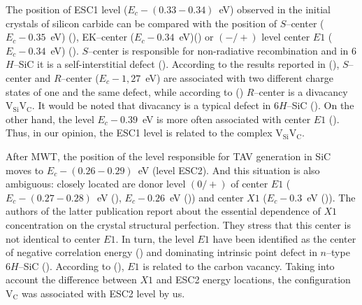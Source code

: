 \documentclass[final,3p,times,twocolumn,authoryear]{elsarticle}
\begin{document}

%





The position of ESC1 level ($E_c-(0.33-0.34)$~eV) observed in the initial crystals of silicon carbide can be compared
with the position of $S$--center ($E_c-0.35$~eV) (\cite{Lebed1999En,Anikin1991:2En,Anikin1991:3En}),
EK–center ($E_c-0.34$~eV)(\cite{Kuznets1997En})
or $(-/+)$ level center $E1$ ($E_c-0.34$~eV) (\cite{Lebed1999En}).
$S$--center is responsible for non-radiative recombination and
in 6$H$–SiC it is a self-interstitial defect (\cite{Lebed1999En}).
According to the results reported in (\cite{Anikin1991:2En,Anikin1991:3En}),
$S$--center and $R$--center ($E_c-1,27$~eV) are associated with two different charge states
of one and the same defect,
while according to (\cite{Lebedev2000En})
$R$--center is a divacancy $\mathrm{V}_\mathrm{Si}\mathrm{V}_\mathrm{C}$.
It would be noted that  divacancy is a typical defect in 6$H$--SiC 
(\cite{SiCBaran,SiCDavid}).
On the other hand, the level $E_c-0.39$~eV is more often associated with center $E1$
(\cite{SiCWei,SiCKoizumi}).
Thus, in our opinion, the ESC1 level is related to the  complex $\mathrm{V}_\mathrm{Si}\mathrm{V}_\mathrm{C}$.


After MWT, the position of the level responsible for TAV generation in SiC moves
to $E_c-(0.26-0.29)$~eV (level ESC2).
And this situation is also ambiguous: closely located are donor level $(0/+)$ of
center $E1$ ($E_c-(0.27-0.28)$~eV (\cite{Hemmingsson}),
$E_c-0.26$~eV (\cite{SiCWei,SiCKoizumi}))
and center $X1$ ($E_c-0.3$~eV (\cite{Lebedev2001En})).
The authors of the latter publication report about the essential dependence of $X1$ concentration on the crystal structural perfection.
They stress that this center is not identical to center $E1$.
In turn, the level $E1$ have been identified as the center of negative correlation energy 
(\cite{Lebedev2001En,SiCWei})
and dominating intrinsic point defect in $n$--type 6$H$--SiC
(\cite{SiCSasaki}).
According to (\cite{SiCSasaki,SiCWei}), $E1$ is related to the carbon vacancy.
Taking into account the difference between $X1$ and ESC2 energy locations,
the configuration $\mathrm{V}_\mathrm{C}$ was associated with ESC2 level by us.
\end{document}
